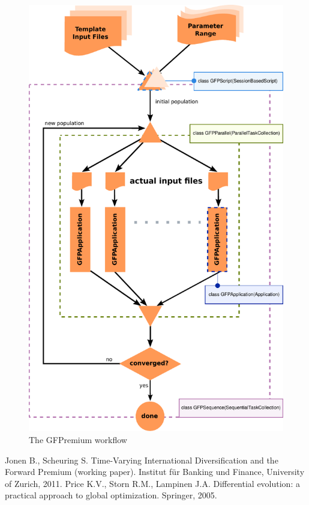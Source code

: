 \documentclass{PoS}
\begin{document}
\begin{figure}
\includegraphics[width=.6\textwidth]{gc3pie_fig1.pdf}
\caption{The GFPremium workflow}
\label{fig1}
\end{figure}

\begin{thebibliography}{99}
   Jonen B., Scheuring S. Time-Varying International
    Diversification and the Forward Premium (working paper). Institut
    für Banking und Finance, University of Zurich, 2011.
   Price K.V., Storn R.M., Lampinen J.A. Differential
    evolution: a practical approach to global optimization. Springer,
    2005.
\end{thebibliography}
\end{document}
